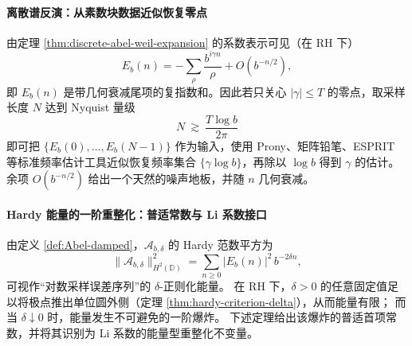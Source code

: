 \paragraph{离散谱反演：从素数块数据近似恢复零点}
由定理 \ref{thm:discrete-abel-weil-expansion} 的系数表示可见（在 RH 下）
\[
E_b(n)=-\sum_{\rho}\frac{b^{i\gamma n}}{\rho}+O(b^{-n/2}),
\]
即 \(E_b(n)\) 是带几何衰减尾项的复指数和。因此若只关心 \(|\gamma|\le T\) 的零点，取采样长度 \(N\) 达到 Nyquist 量级
\[
N\ \gtrsim\ \frac{T\log b}{2\pi}
\]
即可把 \(\{E_b(0),\dots,E_b(N-1)\}\) 作为输入，使用 Prony、矩阵铅笔、ESPRIT 等标准频率估计工具近似恢复频率集合 \(\{\gamma\log b\}\)，再除以 \(\log b\) 得到 \(\gamma\) 的估计。余项 \(O(b^{-n/2})\) 给出一个天然的噪声地板，并随 \(n\) 几何衰减。

\paragraph{Hardy 能量的一阶重整化：普适常数与 Li 系数接口}
由定义 \ref{def:Abel-damped}，\(\mathcal A_{b,\delta}\) 的 Hardy 范数平方为
\[
\|\mathcal A_{b,\delta}\|_{H^2(\mathbb D)}^2
=\sum_{n\ge 0}\bigl|E_b(n)\bigr|^2\,b^{-2\delta n},
\]
可视作“对数采样误差序列”的 \(\delta\)-正则化能量。
在 RH 下，\(\delta>0\) 的任意固定值足以将极点推出单位圆外侧（定理 \ref{thm:hardy-criterion-delta}），从而能量有限；
而当 \(\delta\downarrow 0\) 时，能量发生不可避免的一阶爆炸。
下述定理给出该爆炸的普适首项常数，并将其识别为 Li 系数的能量型重整化不变量。


